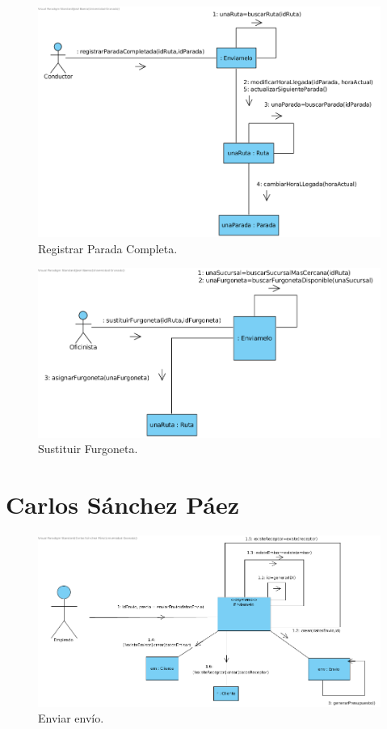 \documentclass[12pt,spanish]{article}
\begin{document}
\begin{figure}[H]
\centering
\includegraphics[scale=0.5]{registrarParadaCompleta.png}
\caption{Registrar Parada Completa.}
\end{figure}

\begin{figure}[H]
\centering
\includegraphics[scale=0.5]{sustituirFurgoneta.png}
\caption{Sustituir Furgoneta.}
\end{figure}


\section{Carlos Sánchez Páez}

\begin{figure}[H]
\centering
\includegraphics[scale=0.5]{enviarEnvio.png}
\caption{Enviar envío.}
\end{figure}
\end{document}
